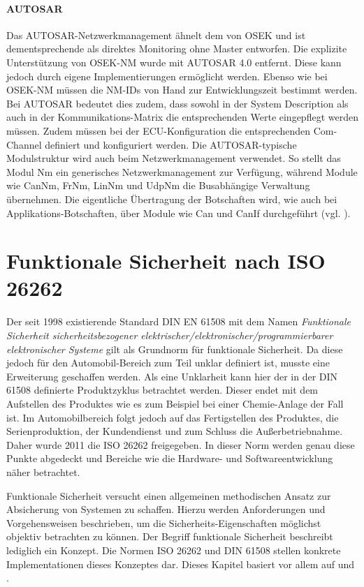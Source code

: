 \documentclass[
  a4paper,					    %
  twoside,
  DIV=calc,     				%
  bibliography=totoc,
  cleardoublepage=empty,
  ngerman,     					%
  final       					%
]{scrbook}
\begin{document}
\paragraph{AUTOSAR}
Das AUTOSAR-Netzwerkmanagement ähnelt dem von OSEK und ist dementsprechende als direktes Monitoring ohne Master entworfen. Die explizite Unterstützung von OSEK-NM wurde mit AUTOSAR 4.0 entfernt. Diese kann jedoch durch eigene Implementierungen ermöglicht werden. Ebenso wie bei OSEK-NM müssen die NM-IDs von Hand zur Entwicklungszeit bestimmt werden. Bei AUTOSAR bedeutet dies zudem, dass sowohl in der System Description als auch in der Kommunikations-Matrix die entsprechenden Werte eingepflegt werden müssen. Zudem müssen bei der ECU-Kon\-fi\-gu\-ra\-tion die entsprechenden Com-Channel definiert und konfiguriert werden. Die AUTOSAR-typische Modulstruktur wird auch beim Netzwerkmanagement verwendet. So stellt das Modul Nm ein generisches Netzwerkmanagement zur Verfügung, während Module wie CanNm, FrNm, LinNm und UdpNm die Busabhängige Verwaltung übernehmen. Die eigentliche Übertragung der Botschaften wird, wie auch bei Applikations-Botschaften, über Module wie Can und CanIf durchgeführt (vgl. \cite{nm_fr}\cite{ZimmermannSchmidgall201011}).



\section{Funktionale Sicherheit nach ISO 26262}
\label{sec:Sicherheit}
Der seit 1998 existierende Standard DIN EN 61508 mit dem Namen \emph{Funktionale Sicherheit sicherheitsbezogener elektrischer/elektronischer/programmierbarer elektronischer Systeme} gilt als Grundnorm für funktionale Sicherheit. Da diese jedoch für den Automobil-Bereich zum Teil unklar definiert ist, musste eine Erweiterung geschaffen werden. Als eine Unklarheit kann hier der in der DIN 61508 definierte Produktzyklus betrachtet werden. Dieser endet mit dem Aufstellen des Produktes wie es zum Beispiel bei einer Chemie-Anlage der Fall ist. Im Automobilbereich folgt jedoch auf das Fertigstellen des Produktes, die Serienproduktion, der Kundendienst und zum Schluss die Außerbetriebnahme. Daher wurde 2011 die ISO 26262 freigegeben. In dieser Norm werden genau diese Punkte abgedeckt und Bereiche wie die Hardware- und Softwareentwicklung näher betrachtet.

Funktionale Sicherheit versucht einen allgemeinen methodischen Ansatz zur Absicherung von Systemen zu schaffen. Hierzu werden Anforderungen und Vorgehensweisen beschrieben, um die Sicherheits-Eigenschaften möglichst objektiv betrachten zu können. Der Begriff funktionale Sicherheit beschreibt lediglich ein Konzept. Die Normen ISO 26262 und DIN 61508 stellen konkrete Implementationen dieses Konzeptes dar. Dieses Kapitel basiert vor allem auf \cite{iso26262} und \cite{iso26262_robuste}.
\end{document}
